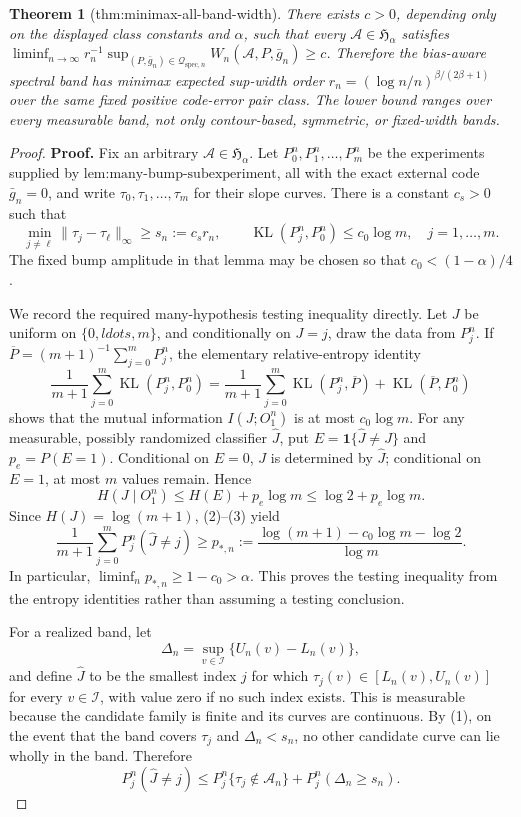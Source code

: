 \documentclass{article}
\newtheorem{theorem}{Theorem}
\begin{document}
\begin{theorem}[thm:minimax-all-band-width]\label{thm:minimax-all-band-width}
There exists \(c>0\), depending only on the displayed class constants and \(\alpha\), such that every \(\mathcal A\in\mathfrak H_\alpha\) satisfies \(\liminf_{n\to\infty}r_n^{-1}\sup_{(P,\bar g_n)\in\mathcal Q_{\mathrm{spec},n}}W_n(\mathcal A,P,\bar g_n)\ge c\). Therefore the bias-aware spectral band has minimax expected sup-width order \(r_n=(\log n/n)^{\beta/(2\beta+1)}\) over the same fixed positive code-error pair class. The lower bound ranges over every measurable band, not only contour-based, symmetric, or fixed-width bands.
\end{theorem}
\begin{proof}
\textbf{Proof.}
Fix an arbitrary \(\mathcal A\in\mathfrak H_\alpha\).  Let \(P_0^n,P_1^n,\ldots,P_m^n\) be the experiments supplied by \(\text{lem:many-bump-subexperiment}\), all with the exact external code \(\bar g_n=0\), and write \(\tau_0,\tau_1,\ldots,\tau_m\) for their slope curves.  There is a constant \(c_s>0\) such that
\[
 \min_{j\ne\ell}\|\tau_j-\tau_\ell\|_\infty
 \ge s_n:=c_sr_n, \qquad
 \operatorname{KL}(P_j^n,P_0^n)\le c_0\log m,
 \quad j=1,\ldots,m. \tag{1}
\]
The fixed bump amplitude in that lemma may be chosen so that \(c_0<(1-\alpha)/4\).

We record the required many-hypothesis testing inequality directly.  Let \(J\) be uniform on \(\{0,ldots,m\}\), and conditionally on \(J=j\), draw the data from \(P_j^n\).  If \(\overline P=(m+1)^{-1}\sum_{j=0}^mP_j^n\), the elementary relative-entropy identity
\[
 \frac1{m+1}\sum_{j=0}^m\operatorname{KL}(P_j^n,P_0^n)
 =\frac1{m+1}\sum_{j=0}^m\operatorname{KL}(P_j^n,\overline P)
 +\operatorname{KL}(\overline P,P_0^n) \tag{2}
\]
shows that the mutual information \(I(J;O_1^n)\) is at most \(c_0\log m\).  For any measurable, possibly randomized classifier \(\widehat J\), put \(E=\mathbf 1\{\widehat J\ne J\}\) and \(p_e=P(E=1)\).  Conditional on \(E=0\), \(J\) is determined by \(\widehat J\); conditional on \(E=1\), at most \(m\) values remain.  Hence
\[
 H(J\mid O_1^n)
 \le H(E)+p_e\log m
 \le\log2+p_e\log m. \tag{3}
\]
Since \(H(J)=\log(m+1)\), (2)--(3) yield
\[
 \frac1{m+1}\sum_{j=0}^mP_j^n(\widehat J\ne j)
 \ge p_{*,n}:=\frac{\log(m+1)-c_0\log m-\log2}{\log m}. \tag{4}
\]
In particular, \(\liminf_np_{*,n}\ge1-c_0>\alpha\).  This proves the testing inequality from the entropy identities rather than assuming a testing conclusion.

For a realized band, let
\[
 \Delta_n=\sup_{v\in\mathcal I}\{U_n(v)-L_n(v)\},
\]
and define \(\widehat J\) to be the smallest index \(j\) for which \(\tau_j(v)\in[L_n(v),U_n(v)]\) for every \(v\in\mathcal I\), with value zero if no such index exists.  This is measurable because the candidate family is finite and its curves are continuous.  By (1), on the event that the band covers \(\tau_j\) and \(\Delta_n<s_n\), no other candidate curve can lie wholly in the band.  Therefore
\[
 P_j^n(\widehat J\ne j)
 \le P_j^n\{\tau_j\notin\mathcal A_n\}
 +P_j^n(\Delta_n\ge s_n). \tag{5}
\]


\end{proof}
\end{document}
